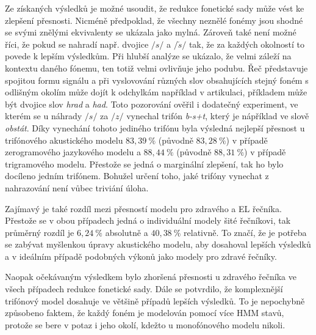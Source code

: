 Ze získaných výsledků je možné usoudit, že redukce fonetické sady může vést ke zlepšení přesnosti. Nicméně předpoklad, že všechny neznělé fonémy jsou shodné se svými znělými ekvivalenty se ukázala jako mylná. Zároveň také není možné říci, že pokud se nahradí např. dvojice $/s/$ a $/\check{s}/$ tak, že za každých okolností to povede k lepším výsledkům. Při hlubší analýze se ukázalo, že velmi záleží na kontextu daného fónemu, ten totiž velmi ovlivňuje jeho podubu. Řeč představuje spojitou formu signálu a při vyslovování různých slov obsahujících stejný foném s odlišným okolím  může dojít k odchylkám například v artikulaci, příkladem může být dvojice slov \textit{hrad} a \textit{had}. Toto pozorování ověřil i dodatečný experiment, ve kterém se u náhrady $/s/$ za $/z/$ vynechal trifón \textit{b-s+t}, který je nápříklad ve slově \textit{obstát}. Díky vynechání tohoto jediného trifónu byla výsledná nejlepší přesnost u trifónového akustického modelu $83,39\ \%$ (původně $83,28\ \%$) v případě zerogramového jazykového modelu a $88,44\ \%$ (původně $88,31\ \%$) v případě trigramového modelu. Přestože se jedná o marginální zlepšení, tak ho bylo docíleno jedním trifónem. Bohužel určení toho, jaké trifóny vynechat z nahrazování není vůbec triviání úloha.

Zajímavý je také rozdíl mezi přesností modelu pro zdravého a EL řečníka. Přestože se v obou případech jedná o individuální modely šité  řečníkovi, tak průměrný rozdíl je $6,24\ \%$ absolutně a $40,38\ \%$ relativně. To značí, že je potřeba se zabývat myšlenkou úpravy akustického modelu, aby dosahoval lepších výsledků a v ideálním případě podobných výkonů jako modely pro zdravé řečníky.

Naopak očekávaným výsledkem bylo zhoršená přesnosti u zdravého řečníka ve všech případech redukce fonetické sady. Dále se potvrdilo, že komplexnější trifónový model dosahuje ve většině případů lepších výsledků. To je nepochybně způsobeno faktem, že každý foném je modelován pomocí více HMM stavů, protože se bere v potaz i jeho okolí, kdežto u monofónového modelu nikoli.
